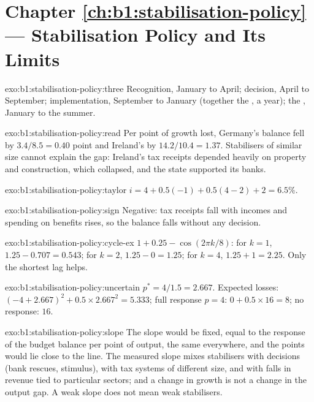 \section*{Chapter \ref{ch:b1:stabilisation-policy} --- Stabilisation Policy and Its Limits}

\begin{solution}{exo:b1:stabilisation-policy:three}
Recognition, January to April; decision, April to September;
implementation, September to January (together the , a year);
the , January to the summer.
\end{solution}

\begin{solution}{exo:b1:stabilisation-policy:read}
Per point of growth lost, Germany's balance fell by $3.4/8.5 = 0.40$ point and
Ireland's by $14.2/10.4 = 1.37$. Stabilisers of similar size cannot explain
the gap: Ireland's tax receipts depended heavily on property and
construction, which collapsed, and the state supported its banks.
\end{solution}

\begin{solution}{exo:b1:stabilisation-policy:taylor}
$i = 4 + 0.5(-1) + 0.5(4 - 2) + 2 = 6.5\%$.
\end{solution}

\begin{solution}{exo:b1:stabilisation-policy:sign}
Negative: tax receipts fall with incomes and spending on benefits rises,
so the balance falls without any decision.
\end{solution}

\begin{solution}{exo:b1:stabilisation-policy:cycle-ex}
$1 + 0.25 - \cos(2\pi k/8)$: for $k = 1$, $1.25 - 0.707 = 0.543$; for $k = 2$, $1.25 - 0 = 1.25$; for $k = 4$,
$1.25 + 1 = 2.25$. Only the shortest lag helps.
\end{solution}

\begin{solution}{exo:b1:stabilisation-policy:uncertain}
$p^* = 4/1.5 = 2.667$. Expected losses: $(-4 + 2.667)^2 + 0.5 \times 2.667^2 = 5.333$; full response
$p = 4$: $0 + 0.5 \times 16 = 8$; no response: $16$.
\end{solution}

\begin{solution}{exo:b1:stabilisation-policy:slope}
The slope would be fixed, equal to the response of the budget balance per
point of output, the same everywhere, and the points would lie close to
the line. The measured slope mixes stabilisers with decisions (bank
rescues, stimulus), with tax systems of different size, and with
falls in revenue tied to particular sectors; and a change in growth is not
a change in the output gap. A weak slope does not mean weak stabilisers.
\end{solution}

